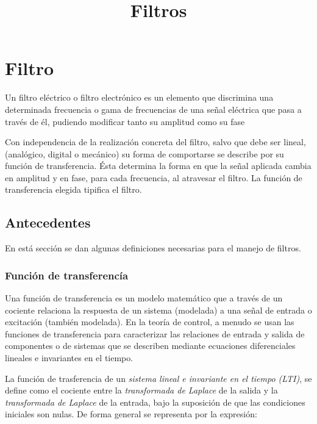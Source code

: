 \documentclass{article}
\title{Filtros}
\begin{document}
    
    
    \maketitle
    
    

    
    \section{Filtro}\label{filtro}

Un filtro eléctrico o filtro electrónico es un elemento que discrimina
una determinada frecuencia o gama de frecuencias de una señal eléctrica
que pasa a través de él, pudiendo modificar tanto su amplitud como su
fase

Con independencia de la realización concreta del filtro, salvo que debe
ser lineal, (analógico, digital o mecánico) su forma de comportarse se
describe por su función de transferencia. Ésta determina la forma en que
la señal aplicada cambia en amplitud y en fase, para cada frecuencia, al
atravesar el filtro. La función de transferencia elegida tipifica el
filtro.

\subsection{Antecedentes}\label{antecedentes}

En está sección se dan algunas definiciones necesarias para el manejo de
filtros.

\subsubsection{Función de
transferencía}\label{funciuxf3n-de-transferencuxeda}

Una función de transferencia es un modelo matemático que a través de un
cociente relaciona la respuesta de un sistema (modelada) a una señal de
entrada o excitación (también modelada). En la teoría de control, a
menudo se usan las funciones de transferencia para caracterizar las
relaciones de entrada y salida de componentes o de sistemas que se
describen mediante ecuaciones diferenciales lineales e invariantes en el
tiempo.

La función de trasferencia de un \emph{sistema lineal e invariante en el
tiempo (LTI)}, se define como el cociente entre la \emph{transformada de
Laplace} de la salida y la \emph{transformada de Laplace} de la entrada,
bajo la suposición de que las condiciones iniciales son nulas. De forma
general se representa por la expresión:
\end{document}
